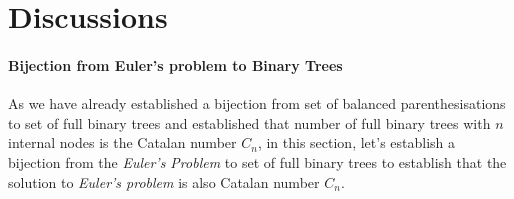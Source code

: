 
\section{Discussions}

\paragraph{Bijection from Euler's problem to Binary Trees} As we have already established a bijection from set of balanced parenthesisations to set of full binary trees and established that number of full binary trees with $n$ internal nodes is the Catalan number $C_n$, in this section, let's establish a bijection from the \emph{Euler's Problem} to set of full binary trees to establish that the solution to \emph{Euler's problem} is also Catalan number $C_n$.

